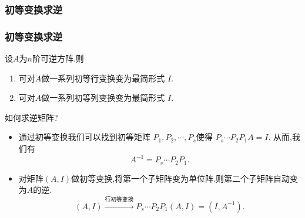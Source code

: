 \renewcommand{\mydate}{2025年04月01号\ 第十一次课}












\subsubsection{初等变换求逆}
\begin{frame}\frametitle{初等变换求逆}

\begin{corollary}设$A$为$n$阶可逆方阵.则
\pp
\begin{enumerate}
\item 可对$A$做一系列初等行变换变为最简形式 $I$.
\pp
\item 可对$A$做一系列初等列变换变为最简形式 $I$.
\end{enumerate}
\end{corollary}
\pp
\bigskip

 如何求逆矩阵?

\pp
\bigskip


\begin{itemize}
\item {} 通过初等变换我们可以找到初等矩阵 $P_1,P_2,\cdots,P_s$使得
$P_s\cdots P_2P_1A=I$. \pp 从而,我们有
\[A^{-1} =  P_s\cdots P_2P_1.\]
 \pp

\item {} 对矩阵$(A,I)$做初等变换,将第一个子矩阵变为单位阵.则第二个子矩阵自动变为$A$的逆. \pp
\[(A,I)\xrightarrow{\text{行初等变换}} P_s\cdots P_2P_1(A,I)=(I,A^{-1}).\]
\end{itemize}
\end{frame}







